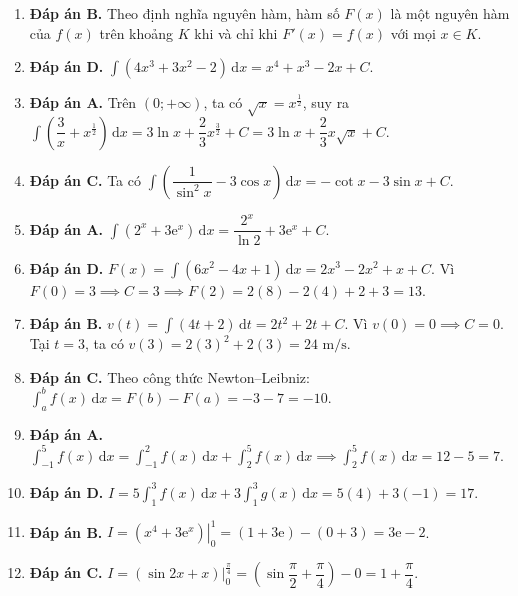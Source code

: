 \documentclass[12pt,a4paper]{article}
\begin{document}
\begin{enumerate}
\item \textbf{Đáp án B.}  
Theo định nghĩa nguyên hàm, hàm số $F(x)$ là một nguyên hàm của $f(x)$ trên khoảng $K$ khi và chỉ khi $F'(x) = f(x)$ với mọi $x \in K$.

\item \textbf{Đáp án D.}  
$\int (4x^3 + 3x^2 - 2)\,\mathrm{d}x = x^4 + x^3 - 2x + C$.

\item \textbf{Đáp án A.}  
Trên $(0; +\infty)$, ta có $\sqrt{x} = x^{\frac{1}{2}}$, suy ra $\int \left(\dfrac{3}{x} + x^{\frac{1}{2}}\right)\,\mathrm{d}x = 3\ln x + \dfrac{2}{3}x^{\frac{3}{2}} + C = 3\ln x + \dfrac{2}{3}x\sqrt{x} + C$.

\item \textbf{Đáp án C.}  
Ta có $\int \left(\dfrac{1}{\sin^2 x} - 3\cos x\right)\,\mathrm{d}x = -\cot x - 3\sin x + C$.

\item \textbf{Đáp án A.}  
$\int (2^x + 3\mathrm{e}^x)\,\mathrm{d}x = \dfrac{2^x}{\ln 2} + 3\mathrm{e}^x + C$.

\item \textbf{Đáp án D.}  
$F(x) = \int (6x^2 - 4x + 1)\,\mathrm{d}x = 2x^3 - 2x^2 + x + C$.  
Vì $F(0) = 3 \implies C = 3 \implies F(2) = 2(8) - 2(4) + 2 + 3 = 13$.

\item \textbf{Đáp án B.}  
$v(t) = \int (4t + 2)\,\mathrm{d}t = 2t^2 + 2t + C$. Vì $v(0) = 0 \implies C = 0$.  
Tại $t = 3$, ta có $v(3) = 2(3)^2 + 2(3) = 24\text{ m/s}$.

\item \textbf{Đáp án C.}  
Theo công thức Newton--Leibniz: $\int_a^b f(x)\,\mathrm{d}x = F(b) - F(a) = -3 - 7 = -10$.

\item \textbf{Đáp án A.}  
$\int_{-1}^5 f(x)\,\mathrm{d}x = \int_{-1}^2 f(x)\,\mathrm{d}x + \int_2^5 f(x)\,\mathrm{d}x \implies \int_2^5 f(x)\,\mathrm{d}x = 12 - 5 = 7$.

\item \textbf{Đáp án D.}  
$I = 5\int_1^3 f(x)\,\mathrm{d}x + 3\int_1^3 g(x)\,\mathrm{d}x = 5(4) + 3(-1) = 17$.

\item \textbf{Đáp án B.}  
$I = \left.\left(x^4 + 3\mathrm{e}^x\right)\right|_0^1 = (1 + 3\mathrm{e}) - (0 + 3) = 3\mathrm{e} - 2$.

\item \textbf{Đáp án C.}  
$I = \left.(\sin 2x + x)\right|_0^{\frac{\pi}{4}} = \left(\sin\dfrac{\pi}{2} + \dfrac{\pi}{4}\right) - 0 = 1 + \dfrac{\pi}{4}$.


\end{enumerate}
\end{document}
